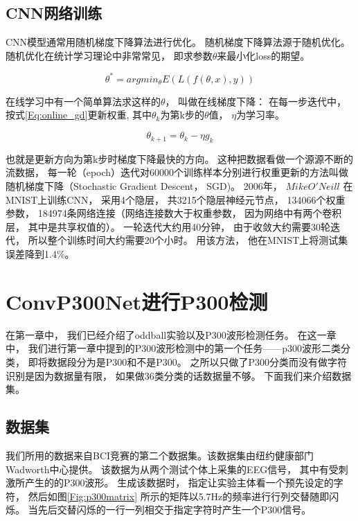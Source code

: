 \subsection{CNN网络训练}

CNN模型通常用随机梯度下降\cite{nemirovski1978cezari,speelpenning1980compiling}算法进行优化。 随机梯度下降算法源于随机优化。 随机优化在统计学习理论中非常常见， 即求参数$\theta$来最小化loss的期望。


\begin{equation}
\label{Eq:stocastic_optimization}
	\theta^* = arg min_{\theta} E(L(f(\theta,x),y))
\end{equation}


在线学习中有一个简单算法求这样的$\theta$， 叫做在线梯度下降\cite{zinkevich2003online}： 在每一步迭代中， 按式\ref{Eq:online_gd}更新权重, 其中$\theta_k$为第k步的$\theta$值， $\eta$为学习率。


\begin{equation}
\label{Eq:online_gd}
	\theta_{k+1} = \theta_k - \eta g_k
\end{equation}

也就是更新方向为第k步时梯度下降最快的方向。 这种把数据看做一个源源不断的流数据， 每一轮（epoch）迭代对60000个训练样本分别进行权重更新的方法叫做随机梯度下降（Stochastic Gradient Descent， SGD)。 2006年， $Mike O'Neill$ 在MNIST上训练CNN， 采用4个隐层， 共3215个隐层神经元节点， 134066个权重参数， 184974条网络连接（网络连接数大于权重参数， 因为网络中有两个卷积层， 其中是共享权值的）。 一轮迭代大约用40分钟， 由于收敛大约需要30轮迭代， 所以整个训练时间大约需要20个小时。 用该方法， 他在MNIST上将测试集误差降到1.4\%。





\section{ConvP300Net进行P300检测}\label{sec:cnn_configure}
在第一章中， 我们已经介绍了oddball实验以及P300波形检测任务。 在这一章中， 我们进行第一章中提到的P300波形检测中的第一个任务——p300波形二类分类， 即将数据段分为是P300和不是P300。 之所以只做了P300分类而没有做字符识别是因为数据量有限， 如果做36类分类的话数据量不够。 下面我们来介绍数据集。


\subsection{数据集}
我们所用的数据来自BCI竞赛的第二个数据集\cite{blankertz2006bci}。该数据集由纽约健康部门Wadworth中心提供。 该数据为从两个测试个体上采集的EEG信号， 其中有受刺激所产生的的P300波形。 生成该数据时， 指定让实验主体看一个预先设定的字符， 然后如图\ref{Fig:p300matrix} 所示的矩阵以5.7Hz的频率进行行列交替随即闪烁。 当先后交替闪烁的一行一列相交于指定字符时产生一个P300信号。 

